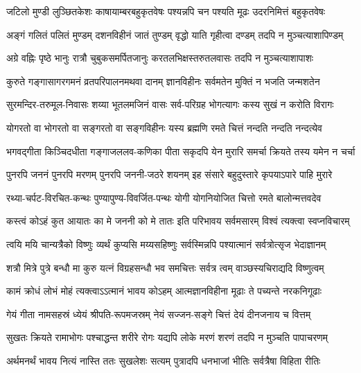 \begin{large}
\begin{multicols}{2}
\begin{flushleft}
\fourlineindentedshloka
{जटिलो मुण्डी लुञ्छितकेशः}
{काषायाम्बरबहुकृतवेषः}
{पश्यन्नपि चन पश्यति मूढः}
{उदरनिमित्तं बहुकृतवेषः}

\fourlineindentedshloka
{अङ्गं गलितं पलितं मुण्डम्}
{दशनविहीनं जातं तुण्डम्}
{वृद्धो याति गृहीत्वा दण्डम्}
{तदपि न मुञ्चत्याशापिण्डम्}

\fourlineindentedshloka
{अग्रे वह्निः पृष्ठे भानुः}
{रात्रौ चुबुकसमर्पितजानुः}
{करतलभिक्षस्तरुतलवासः}
{तदपि न मुञ्चत्याशापाशः}

\fourlineindentedshloka
{कुरुते गङ्गासागरगमनं}
{व्रतपरिपालनमथवा दानम्}
{ज्ञानविहीनः सर्वमतेन}
{मुक्तिं न भजति जन्मशतेन}

\fourlineindentedshloka
{सुरमन्दिर-तरुमूल-निवासः}
{शय्या भूतलमजिनं वासः}
{सर्व-परिग्रह भोगत्यागः}
{कस्य सुखं न करोति विरागः}

\fourlineindentedshloka
{योगरतो वा भोगरतो वा}
{सङ्गरतो वा सङ्गविहीनः}
{यस्य ब्रह्मणि रमते चित्तं}
{नन्दति नन्दति नन्दत्येव}

\fourlineindentedshloka
{भगवद्गीता किञ्चिदधीता}
{गङ्गाजललव-कणिका पीता}
{सकृदपि येन मुरारि समर्चा}
{क्रियते तस्य यमेन न चर्चा}

\fourlineindentedshloka
{पुनरपि जननं पुनरपि मरणम्}
{पुनरपि जननी-जठरे शयनम्}
{इह संसारे बहुदुस्तारे}
{कृपयाऽपारे पाहि मुरारे}

\fourlineindentedshloka
{रथ्या-चर्पट-विरचित-कन्थः}
{पुण्यापुण्य-विवर्जित-पन्थः}
{योगी योगनियोजित चित्तो}
{रमते बालोन्मत्तवदेव}

\fourlineindentedshloka
{कस्त्वं कोऽहं कुत आयातः}
{का मे जननी को मे तातः}
{इति परिभावय सर्वमसारम्}
{विश्वं त्यक्त्वा स्वप्नविचारम्}

\fourlineindentedshloka
{त्वयि मयि चान्यत्रैको विष्णुः}
{व्यर्थं कुप्यसि मय्यसहिष्णुः}
{सर्वस्मिन्नपि पश्यात्मानं}
{सर्वत्रोत्सृज भेदाज्ञानम्}

\fourlineindentedshloka
{शत्रौ मित्रे पुत्रे बन्धौ}
{मा कुरु यत्नं विग्रहसन्धौ}
{भव समचित्तः सर्वत्र त्वम्}
{वाञ्छस्यचिराद्यदि विष्णुत्वम्}

\fourlineindentedshloka
{कामं क्रोधं लोभं मोहं}
{त्यक्त्वाऽऽत्मानं भावय कोऽहम्}
{आत्मज्ञानविहीना मूढाः}
{ते पच्यन्ते नरकनिगूढाः}

\fourlineindentedshloka
{गेयं गीता नामसहस्रं}
{ध्येयं श्रीपति-रूपमजस्रम्}
{नेयं सज्जन-सङ्गे चित्तं}
{देयं दीनजनाय च वित्तम्}

\fourlineindentedshloka
{सुखतः क्रियते रामाभोगः}
{पश्चाद्धन्त शरीरे रोगः}
{यद्यपि लोके मरणं शरणं}
{तदपि न मुञ्चति पापाचरणम्}

\fourlineindentedshloka
{अर्थमनर्थं भावय नित्यं}
{नास्ति ततः सुखलेशः सत्यम्}
{पुत्रादपि धनभाजां भीतिः}
{सर्वत्रैषा विहिता रीतिः}


\end{flushleft}
\end{multicols}
\end{large}
